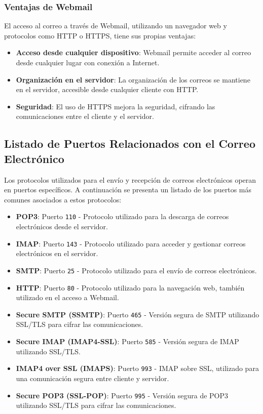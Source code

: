 \documentclass[a4paper,12pt]{article}
\begin{document}
\subsubsection{Ventajas de Webmail}

El acceso al correo a través de Webmail, utilizando un navegador web y protocolos como HTTP o HTTPS, tiene sus propias ventajas:

\begin{itemize}
    \item \textbf{Acceso desde cualquier dispositivo}: Webmail permite acceder al correo desde cualquier lugar con conexión a Internet.
    \item \textbf{Organización en el servidor}: La organización de los correos se mantiene en el servidor, accesible desde cualquier cliente con HTTP.
    \item \textbf{Seguridad}: El uso de HTTPS mejora la seguridad, cifrando las comunicaciones entre el cliente y el servidor.
\end{itemize}
\subsection{Listado de Puertos Relacionados con el Correo Electrónico}

Los protocolos utilizados para el envío y recepción de correos electrónicos operan en puertos específicos. A continuación se presenta un listado de los puertos más comunes asociados a estos protocolos:

\begin{itemize}
    \item \textbf{POP3}: Puerto \texttt{110} - Protocolo utilizado para la descarga de correos electrónicos desde el servidor.
    \item \textbf{IMAP}: Puerto \texttt{143} - Protocolo utilizado para acceder y gestionar correos electrónicos en el servidor.
    \item \textbf{SMTP}: Puerto \texttt{25} - Protocolo utilizado para el envío de correos electrónicos.
    \item \textbf{HTTP}: Puerto \texttt{80} - Protocolo utilizado para la navegación web, también utilizado en el acceso a Webmail.
    \item \textbf{Secure SMTP (SSMTP)}: Puerto \texttt{465} - Versión segura de SMTP utilizando SSL/TLS para cifrar las comunicaciones.
    \item \textbf{Secure IMAP (IMAP4-SSL)}: Puerto \texttt{585} - Versión segura de IMAP utilizando SSL/TLS.
    \item \textbf{IMAP4 over SSL (IMAPS)}: Puerto \texttt{993} - IMAP sobre SSL, utilizado para una comunicación segura entre cliente y servidor.
    \item \textbf{Secure POP3 (SSL-POP)}: Puerto \texttt{995} - Versión segura de POP3 utilizando SSL/TLS para cifrar las comunicaciones.
\end{itemize}
\end{document}
